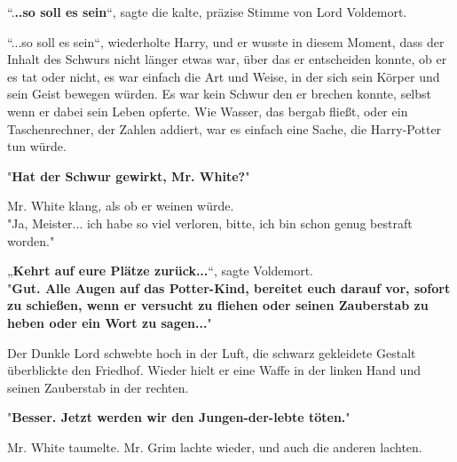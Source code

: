 {“.\textbf{..so soll es sein}“, sagte die kalte, präzise Stimme von Lord Voldemort.

“...so soll es sein“, wiederholte Harry, und er wusste in diesem Moment, dass der Inhalt des Schwurs nicht länger etwas war, über das er entscheiden konnte, ob er es tat oder nicht, es war einfach die Art und Weise, in der sich sein Körper und sein Geist bewegen würden. Es war kein Schwur den er brechen konnte, selbst wenn er dabei sein Leben opferte. Wie Wasser, das bergab fließt, oder ein Taschenrechner, der Zahlen addiert, war es einfach eine Sache, die Harry-Potter tun würde.

"\textbf{Hat der Schwur gewirkt, Mr. White?}"

Mr. White klang, als ob er weinen würde.\\ "Ja, Meister... ich habe so viel verloren, bitte, ich bin schon genug bestraft worden."

„\textbf{Kehrt auf eure Plätze zurück...}“, sagte Voldemort.\\ "\textbf{Gut. Alle Augen auf das Potter-Kind, bereitet euch darauf vor, sofort zu schießen, wenn er versucht zu fliehen oder seinen Zauberstab zu heben oder ein Wort zu sagen...}"

Der Dunkle Lord schwebte hoch in der Luft, die schwarz gekleidete Gestalt überblickte den Friedhof. Wieder hielt er eine Waffe in der linken Hand und seinen Zauberstab in der rechten.

"\textbf{Besser. Jetzt werden wir den Jungen-der-lebte töten.}"

Mr. White taumelte. Mr. Grim lachte wieder, und auch die anderen lachten.

}
